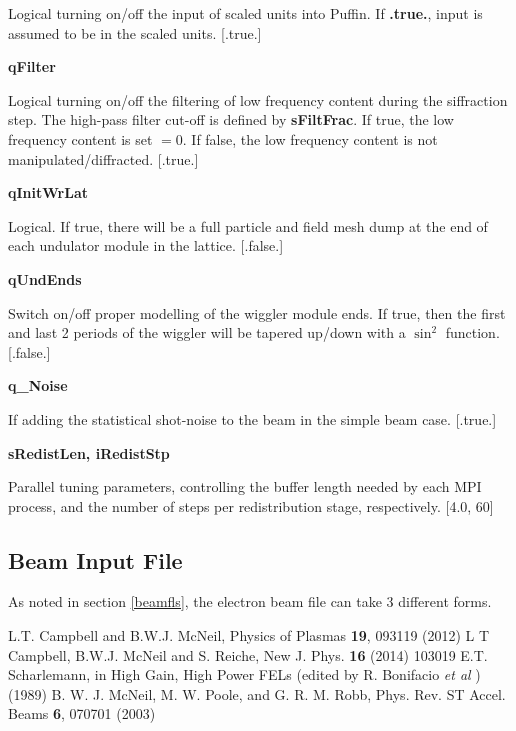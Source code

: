 \documentclass[12pt]{article}%
\begin{document}
Logical turning on/off the input of scaled units into Puffin. If {\bf .true.}, input is assumed to be in the scaled units. [.true.]

{\bf qFilter}

Logical turning on/off the filtering of low frequency content during the siffraction step. The high-pass filter cut-off is defined by {\bf sFiltFrac}. If true, the low frequency content is set $=0$. If false, the low frequency content is not manipulated/diffracted. [.true.]

{\bf qInitWrLat}

Logical. If true, there will be a full particle and field mesh dump at the end of each undulator module in the lattice. [.false.]

{\bf qUndEnds}

Switch on/off proper modelling of the wiggler module ends. If true, then the first and last 2 periods of the wiggler will be tapered up/down with a $\sin^2$ function. [.false.]

{\bf q\_Noise}

If adding the statistical shot-noise to the beam in the simple beam case. [.true.]

{\bf sRedistLen, iRedistStp}

Parallel tuning parameters, controlling the buffer length needed by each MPI process, and the number of steps per redistribution stage, respectively. [4.0, 60]

\newpage

\subsection{Beam Input File}

As noted in section \ref{beamfls}, the electron beam file can take 3 different forms.


\newpage

\begin{thebibliography}{10}

L.T. Campbell and B.W.J. McNeil, Physics of Plasmas {\bf 19}, 093119 (2012)
L T Campbell, B.W.J. McNeil and S. Reiche, New J. Phys. {\bf 16} (2014) 103019
E.T. Scharlemann, in High Gain, High Power FELs (edited by R. Bonifacio \textit{et al} ) (1989)
B. W. J. McNeil, M. W. Poole, and G. R. M. Robb, Phys. Rev. ST Accel. Beams {\bf 6}, 070701 (2003)


\end{thebibliography}
\end{document}
